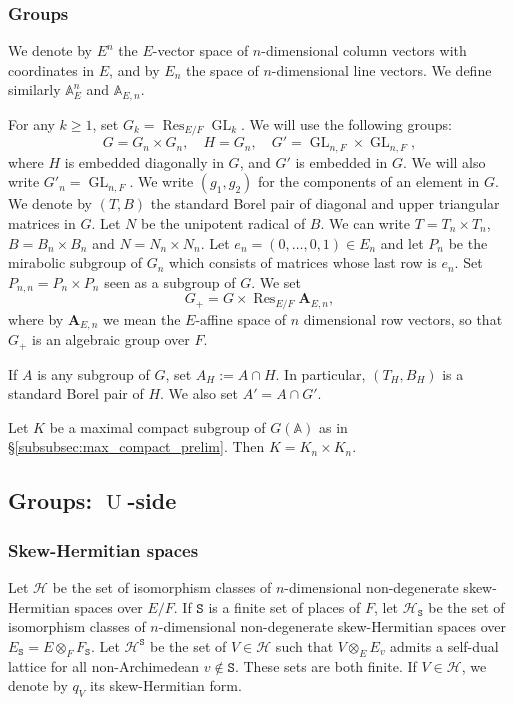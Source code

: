 \documentclass[letterpaper,11pt]{amsart}
\newcommand{\bA}{\mathbb{A}}
\newcommand{\cH}{\mathcal{H}}
\newcommand{\tS}{\mathtt{S}}
\newcommand{\<}{\negthickspace}
\DeclareMathOperator{\GL}{GL}
\DeclareMathOperator{\U}{U}
\DeclareMathOperator{\Res}{Res}
\theoremstyle{definition}
\theoremstyle{plain}
\theoremstyle{remark}
\numberwithin{equation}{section}
\begin{document}
\subsubsection{Groups}

We denote by $E^n$ the $E$-vector space of $n$-dimensional column vectors with coordinates in $E$, and by $E_n$ the space of $n$-dimensional line vectors. We define similarly $\bA_E^n$ and $\bA_{E,n}$.

For any $k \geq 1$, set $G_k=\Res_{E/F} \GL_k$. We will use the following groups: 
\begin{equation*}
    G=G_n \times G_n, \quad H=G_n, \quad G'=\GL_{n,F} \times \GL_{n,F},
\end{equation*}
where $H$ is embedded diagonally in $G$, and $G'$ is embedded in $G$. We will also write $G'_n=\GL_{n,F}$. We write $(g_1,g_2)$ for the components of an element in $G$. We denote by $(T,B)$ the standard Borel pair of diagonal and upper triangular matrices in $G$. Let $N$ be the unipotent radical of $B$. We can write $T=T_{n} \times T_{n}$, $B=B_{n} \times B_{n}$ and $N=N_{n} \times N_{n}$. Let $e_n=(0,\hdots,0,1) \in E_n$ and let $P_n$ be the mirabolic subgroup of $G_n$ which consists of matrices whose last row is $e_n$. Set $P_{n,n}=P_n \times P_n$ seen as a subgroup of $G$. We set
\begin{equation*}
    G_+=G \times \Res_{E/F} \mathbf{A}_{E,n},
\end{equation*}
where by $\mathbf{A}_{E,n}$ we mean the $E$-affine space of $n$ dimensional row vectors, so that $G_+$ is an algebraic group over $F$.

If $A$ is any subgroup of $G$, set $A_H:=A \cap H$. In particular, $(T_{H},B_{H})$ is a standard Borel pair of $H$. We also set $A'=A \cap G'$.

Let $K$ be a maximal compact subgroup of $G(\bA)$ as in \S\ref{subsubsec:max_compact_prelim}. Then $K=K_n \times K_n$.

\subsection{Groups: $\U$-side}

\subsubsection{Skew-Hermitian spaces} Let $\cH$ be the set of isomorphism classes of $n$-dimensional non-degenerate skew-Hermitian spaces over $E/F$. If $\tS$ is a finite set of places of $F$, let $\cH_{\tS}$ be the set of isomorphism classes of $n$-dimensional non-degenerate skew-Hermitian spaces over $E_\tS=E \otimes_F F_{\tS}$. Let $\cH^{\tS}$ be the set of $V \in \cH$ such that $V \otimes_E E_v$ admits a self-dual lattice for all non-Archimedean $v \notin \tS$. These sets are both finite. If $V \in \cH$, we denote by $q_V$ its skew-Hermitian form.
\end{document}
